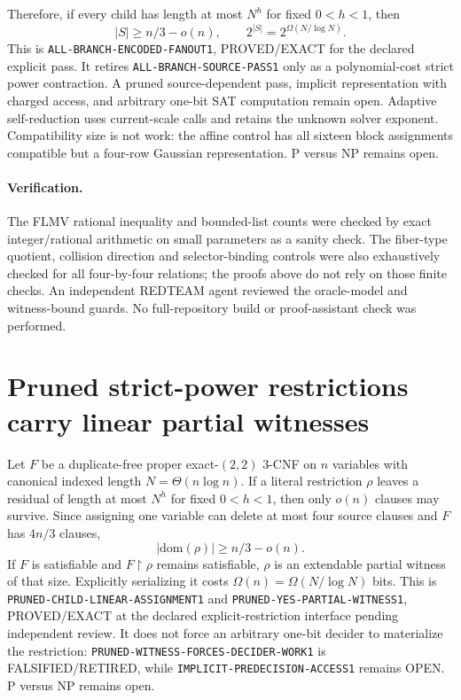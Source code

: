 \documentclass[11pt]{article}
\begin{document}
Therefore, if every child has length at most \(N^h\) for fixed \(0<h<1\),
then
\[
 |S|\ge n/3-o(n),\qquad
 2^{|S|}=2^{\Omega(N/\log N)}.
\]
This is \texttt{ALL-BRANCH-ENCODED-FANOUT1}, PROVED/EXACT for the declared
explicit pass. It retires \texttt{ALL-BRANCH-SOURCE-PASS1} only as a
polynomial-cost strict power contraction. A pruned source-dependent pass,
implicit representation with charged access, and arbitrary one-bit SAT
computation remain open. Adaptive self-reduction uses current-scale calls
and retains the unknown solver exponent. Compatibility size is not work:
the affine control has all sixteen block assignments compatible but a
four-row Gaussian representation. P versus NP remains open.

\paragraph{Verification.}
The FLMV rational inequality and bounded-list counts were checked by exact
integer/rational arithmetic on small parameters as a sanity check.  The
fiber-type quotient, collision direction and selector-binding controls were
also exhaustively checked for all four-by-four relations; the proofs above
do not rely on those finite checks. An independent REDTEAM
agent reviewed the oracle-model and witness-bound guards.
No full-repository build or proof-assistant check was performed.


\section{Pruned strict-power restrictions carry linear partial witnesses}
Let $F$ be a duplicate-free proper exact-$(2,2)$ 3-CNF on $n$ variables with canonical indexed length $N=\Theta(n\log n)$.  If a literal restriction $\rho$ leaves a residual of length at most $N^h$ for fixed $0<h<1$, then only $o(n)$ clauses may survive.  Since assigning one variable can delete at most four source clauses and $F$ has $4n/3$ clauses,
\[
 |\mathrm{dom}(\rho)|\ge n/3-o(n).
\]
If $F$ is satisfiable and $F\upharpoonright\rho$ remains satisfiable, $\rho$ is an extendable partial witness of that size.  Explicitly serializing it costs $\Omega(n)=\Omega(N/\log N)$ bits.  This is \texttt{PRUNED-CHILD-LINEAR-ASSIGNMENT1} and \texttt{PRUNED-YES-PARTIAL-WITNESS1}, PROVED/EXACT at the declared explicit-restriction interface pending independent review.  It does not force an arbitrary one-bit decider to materialize the restriction: \texttt{PRUNED-WITNESS-FORCES-DECIDER-WORK1} is FALSIFIED/RETIRED, while \texttt{IMPLICIT-PREDECISION-ACCESS1} remains OPEN.  P versus NP remains open.



\end{document}
